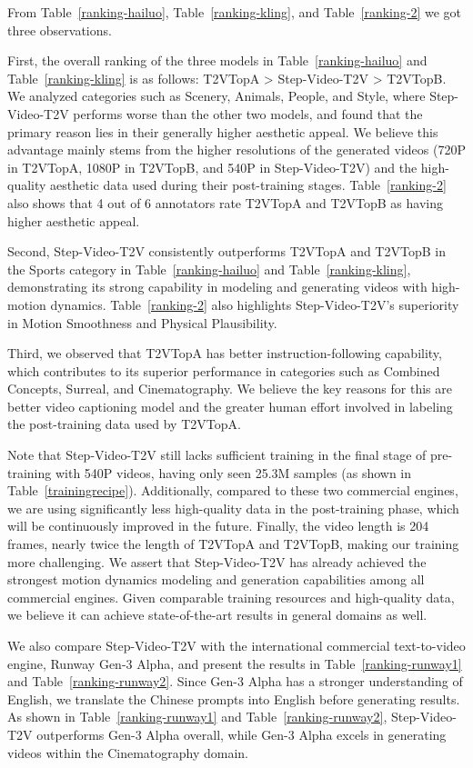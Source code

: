 From Table~\ref{ranking-hailuo}, Table~\ref{ranking-kling}, and Table~\ref{ranking-2} we got three observations.

First, the overall ranking of the three models in Table~\ref{ranking-hailuo} and Table~\ref{ranking-kling} is as follows: T2VTopA > Step-Video-T2V > T2VTopB. We analyzed categories such as Scenery, Animals, People, and Style, where Step-Video-T2V performs worse than the other two models, and found that the primary reason lies in their generally higher aesthetic appeal. We believe this advantage mainly stems from the higher resolutions of the generated videos (720P in T2VTopA, 1080P in T2VTopB, and 540P in Step-Video-T2V) and the high-quality aesthetic data used during their post-training stages. Table~\ref{ranking-2} also shows that 4 out of 6 annotators rate T2VTopA and T2VTopB as having higher aesthetic appeal.

Second, Step-Video-T2V consistently outperforms T2VTopA and T2VTopB in the Sports category in Table~\ref{ranking-hailuo} and Table~\ref{ranking-kling}, demonstrating its strong capability in modeling and generating videos with high-motion dynamics. Table~\ref{ranking-2} also highlights Step-Video-T2V's superiority in Motion Smoothness and Physical Plausibility.

Third, we observed that T2VTopA has better instruction-following capability, which contributes to its superior performance in categories such as Combined Concepts, Surreal, and Cinematography. We believe the key reasons for this are better video captioning model and the greater human effort involved in labeling the post-training data used by T2VTopA.

Note that Step-Video-T2V still lacks sufficient training in the final stage of pre-training with 540P videos, having only seen 25.3M samples (as shown in Table~\ref{trainingrecipe}). Additionally, compared to these two commercial engines, we are using significantly less high-quality data in the post-training phase, which will be continuously improved in the future. Finally, the video length is 204 frames, nearly twice the length of T2VTopA and T2VTopB, making our training more challenging. We assert that Step-Video-T2V has already achieved the strongest motion dynamics modeling and generation capabilities among all commercial engines. Given comparable training resources and high-quality data, we believe it can achieve state-of-the-art results in general domains as well.

We also compare Step-Video-T2V with the international commercial text-to-video engine, Runway Gen-3 Alpha, and present the results in Table~\ref{ranking-runway1} and Table~\ref{ranking-runway2}. Since Gen-3 Alpha has a stronger understanding of English, we translate the Chinese prompts into English before generating results. As shown in Table~\ref{ranking-runway1} and Table~\ref{ranking-runway2}, Step-Video-T2V outperforms Gen-3 Alpha overall, while Gen-3 Alpha excels in generating videos within the Cinematography domain.


